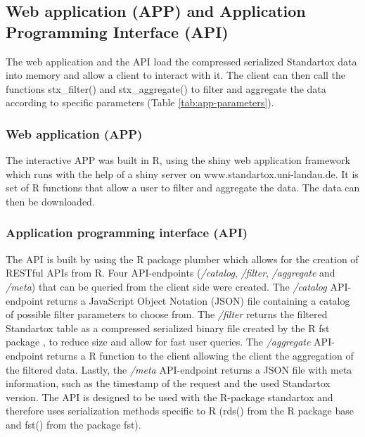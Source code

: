 
\subsection*{Web application (APP) and Application Programming Interface (API)}
The web application and the API load the compressed serialized Standartox data into memory and allow a client to interact with it. The client can then call the functions stx\_filter() and stx\_aggregate() to filter and aggregate the data according to specific parameters (Table \ref{tab:app-parameters}).

\subsubsection*{Web application (APP)}
The interactive APP was built in R, using the shiny web application framework \citep{chang_shiny_2018} which runs with the help of a shiny server \citep{HOW-TO-CITE-SHINY-SERVER} on www.standartox.uni-landau.de. It is set of R functions that allow a user to filter and aggregate the data. The data can then be downloaded.

\subsubsection*{Application programming interface (API)}
The API is built by using the R package plumber \citep{trestletechnologyllc_plumber_2018} which allows for the creation of RESTful APIs from R. Four API-endpoints (\textit{/catalog}, \textit{/filter}, \textit{/aggregate} and \textit{/meta}) that can be queried from the client side were created. The \textit{/catalog} API-endpoint returns a JavaScript Object Notation (JSON) file containing a catalog of possible filter parameters to choose from. The \textit{/filter} returns the filtered Standartox table as a compressed serialized binary file created by the R fst package \citep{klik_fst_2019}, to reduce size and allow for fast user queries. The \textit{/aggregate} API-endpoint returns a R function to the client allowing the client the aggregation of the filtered data. Lastly, the \textit{/meta} API-endpoint returns a JSON file with meta information, such as the timestamp of the request and the used Standartox version. The API is designed to be used with the R-package standartox and therefore uses serialization methods specific to R (rds() from the R package base and fst() from the package fst).

